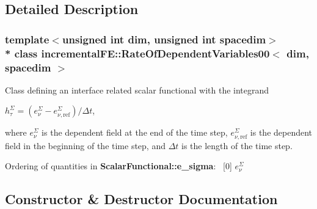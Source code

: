 \subsection{Detailed Description}
\subsubsection*{template$<$unsigned int dim, unsigned int spacedim$>$\\*
class incremental\+F\+E\+::\+Rate\+Of\+Dependent\+Variables00$<$ dim, spacedim $>$}

Class defining an interface related scalar functional with the integrand

$h^\Sigma_\tau = (e^\Sigma_\nu-e^\Sigma_{\nu,\mathrm{ref}})/\Delta t$,

where $e^\Sigma_\nu$ is the dependent field at the end of the time step, $e^\Sigma_{\nu,\mathrm{ref}}$ is the dependent field in the beginning of the time step, and $\Delta t$ is the length of the time step.

Ordering of quantities in {\bf Scalar\+Functional\+::e\+\_\+sigma}\+:~\newline
 \mbox{[}0\mbox{]} $e^\Sigma_\nu$ 

\subsection{Constructor \& Destructor Documentation}
